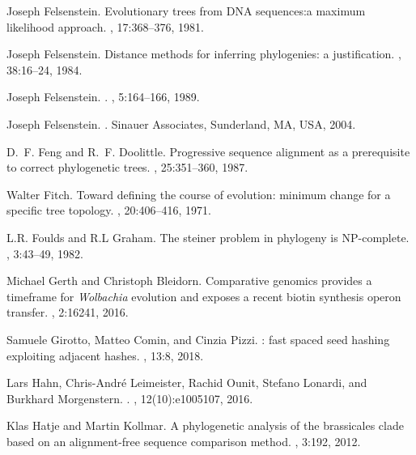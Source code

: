 \documentclass[review]{elsarticle}
\begin{document}
{\begin{thebibliography}{10}
Joseph Felsenstein.
\newblock Evolutionary trees from {DNA} sequences:a maximum likelihood
  approach.
, 17:368--376, 1981.

Joseph Felsenstein.
\newblock Distance methods for inferring phylogenies: a justification.
,
  38:16--24, 1984.

Joseph Felsenstein.
.
, 5:164--166, 1989.

Joseph Felsenstein.
.
\newblock Sinauer Associates, Sunderland, MA, USA, 2004.

D.~F. Feng and R.~F. Doolittle.
\newblock Progressive sequence alignment as a prerequisite to correct
  phylogenetic trees.
, 25:351--360, 1987.

Walter Fitch.
\newblock Toward defining the course of evolution: minimum change for a
  specific tree topology.
, 20:406--416, 1971.

L.R. Foulds and R.L Graham.
\newblock The steiner problem in phylogeny is {NP}-complete.
, 3:43--49, 1982.

Michael Gerth and Christoph Bleidorn.
\newblock Comparative genomics provides a timeframe for {{\em Wolbachia}}
  evolution and exposes a recent biotin synthesis operon transfer.
, 2:16241, 2016.

Samuele Girotto, Matteo Comin, and Cinzia Pizzi.
: fast spaced seed hashing exploiting adjacent hashes.
, 13:8, 2018.

Lars Hahn, Chris-Andr{\'e} Leimeister, Rachid Ounit, Stefano Lonardi, and
  Burkhard Morgenstern.
.
, 12(10):e1005107, 2016.

Klas Hatje and Martin Kollmar.
\newblock A phylogenetic analysis of the brassicales clade based on an
  alignment-free sequence comparison method.
, 3:192, 2012.


\end{thebibliography}}
\end{document}
